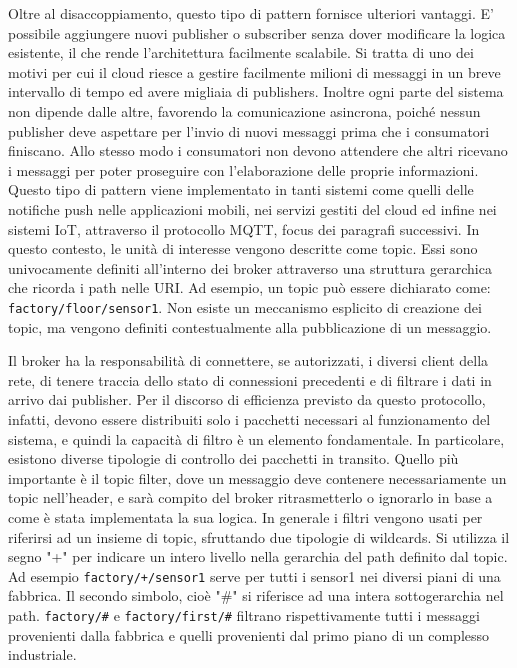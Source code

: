 Oltre al disaccoppiamento, questo tipo di pattern fornisce ulteriori vantaggi\cite{a7IoT4Arch}. E' possibile aggiungere nuovi publisher o subscriber senza dover modificare la logica esistente, il che rende l'architettura facilmente scalabile. Si tratta di uno dei motivi per cui il cloud riesce a gestire facilmente milioni di messaggi in un breve intervallo di tempo ed avere migliaia di publishers. Inoltre ogni parte del sistema non dipende dalle altre, favorendo la comunicazione asincrona, poiché nessun publisher deve aspettare per l'invio di nuovi messaggi prima che i consumatori finiscano. Allo stesso modo i consumatori non devono attendere che altri ricevano i messaggi per poter proseguire con l'elaborazione delle proprie informazioni. Questo tipo di pattern viene implementato in tanti sistemi come quelli delle notifiche push nelle applicazioni mobili, nei servizi gestiti del cloud ed infine nei sistemi IoT, attraverso il protocollo MQTT, focus dei paragrafi successivi. In questo contesto, le unità di interesse vengono descritte come topic. Essi sono univocamente definiti all'interno dei broker attraverso una struttura gerarchica che ricorda i path nelle URI. Ad esempio, un topic può essere dichiarato come: \texttt{factory/floor/sensor1}. Non esiste un meccanismo esplicito di creazione dei topic, ma vengono definiti contestualmente alla pubblicazione di un messaggio.

Il broker ha la responsabilità di connettere, se autorizzati, i diversi client della rete, di tenere traccia dello stato di connessioni precedenti e di filtrare i dati in arrivo dai publisher. Per il discorso di efficienza previsto da questo protocollo, infatti, devono essere distribuiti solo i pacchetti necessari al funzionamento del sistema, e quindi la capacità di filtro è un elemento fondamentale. In particolare, esistono diverse tipologie di controllo dei pacchetti in transito. Quello più importante è il topic filter, dove un messaggio deve contenere necessariamente un topic nell'header, e sarà compito del broker ritrasmetterlo o ignorarlo in base a come è stata implementata la sua logica. In generale i filtri vengono usati per riferirsi ad un insieme di topic, sfruttando due tipologie di wildcards. Si utilizza il segno "+" per indicare un intero livello nella gerarchia del path definito dal topic. Ad esempio \texttt{factory/+/sensor1} serve per tutti i sensor1 nei diversi piani di una fabbrica. Il secondo simbolo, cioè "\#" si riferisce ad una intera sottogerarchia nel path. \texttt{factory/\#} e \texttt{factory/first/\#} filtrano rispettivamente tutti i messaggi provenienti dalla fabbrica e quelli provenienti dal primo piano di un complesso industriale. 

